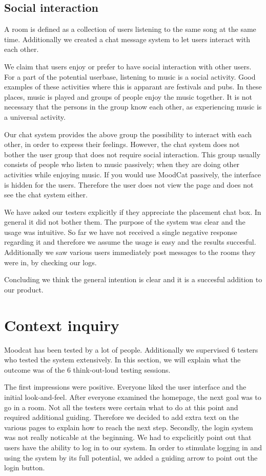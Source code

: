 \subsection{Social interaction}

A room is defined as a collection of users listening to the same song at the same time.
Additionally we created a chat message system to let users interact with each other.

We claim that users enjoy or prefer to have social interaction with other users.
For a part of the potential userbase, listening to music is a social activity.
Good examples of these activities where this is apparant are festivals and pubs.
In these places, music is played and groups of people enjoy the music together.
It is not necessary that the persons in the group know each other, as experiencing music is a universal activity.

Our chat system provides the above group the possibility to interact with each other, in order to express their feelings.
However, the chat system does not bother the user group that does not require social interaction.
This group usually consists of people who listen to music passively; when they are doing other activities while enjoying music.
If you would use MoodCat passively, the interface is hidden for the users.
Therefore the user does not view the page and does not see the chat system either.

We have asked our testers explicitly if they appreciate the placement chat box.
In general it did not bother them.
The purpose of the system was clear and the usage was intuitive.
So far we have not received a single negative response regarding it and therefore we assume the usage is easy and the results succesful.
Additionally we saw various users immediately post messages to the rooms they were in, by checking our logs.

Concluding we think the general intention is clear and it is a succesful addition to our product.

\section{Context inquiry}
Moodcat has been tested by a lot of people.
Additionally we supervised 6 testers who tested the system extensively.
In this section, we will explain what the outcome was of the 6 think-out-loud testing sessions.

The first impressions were positive.
Everyone liked the user interface and the initial look-and-feel.
After everyone examined the homepage, the next goal was to go in a room.
Not all the testers were certain what to do at this point and required additional guiding.
Therefore we decided to add extra text on the various pages to explain how to reach the next step.
Secondly, the login system was not really noticable at the beginning.
We had to expclicitly point out that users have the ability to log in to our system.
In order to stimulate logging in and using the system by its full potential, we added a guiding arrow to point out the login button.


